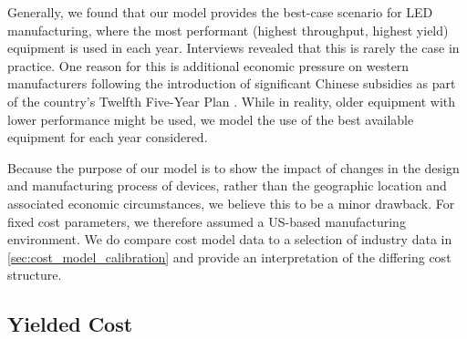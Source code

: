 \documentclass[parskip=full]{article}
\begin{document}
Generally, we found that our model provides the best-case scenario for LED manufacturing, where the most performant (highest throughput, highest yield) equipment is used in each year. Interviews revealed that this is rarely the case in practice. One reason for this is additional economic pressure on western manufacturers following the introduction of significant Chinese subsidies as part of the country's Twelfth Five-Year Plan \cite{sanderson2014light}. While in reality, older equipment with lower performance might be used, we model the use of the best available equipment for each year considered.

Because the purpose of our model is to show the impact of changes in the design and manufacturing process of devices, rather than the geographic location and associated economic circumstances, we believe this to be a minor drawback. For fixed cost parameters, we therefore assumed a US-based manufacturing environment. We do compare cost model data to a selection of industry data in \cref{sec:cost_model_calibration} and provide an interpretation of the differing cost structure.

\subsection{Yielded Cost}
\label{sec:cost_computation}
\end{document}
